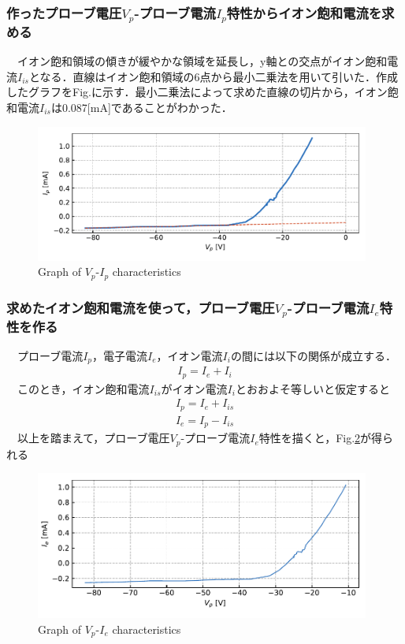 \subsubsection{作ったプローブ電圧$V_p$-プローブ電流$I_p$特性からイオン飽和電流を求める}
　イオン飽和領域の傾きが緩やかな領域を延長し，y軸との交点がイオン飽和電流$I_{is}$となる．直線はイオン飽和領域の6点から最小二乗法を用いて引いた．作成したグラフをFig.\label{fig:Vp-Ip-iis}に示す．最小二乗法によって求めた直線の切片から，イオン飽和電流$I_{is}$は0.087[mA]であることがわかった．
\begin{figure}[H]
    \centering
    \includegraphics[width=11cm]{./fig/3_2.pdf}
    \caption{Graph of $V_p$-$I_p$ characteristics}
    \label{fig:Vp-Ip-iis}
\end{figure}

\subsubsection{求めたイオン飽和電流を使って，プローブ電圧$V_p$-プローブ電流$I_e$特性を作る}
　プローブ電流$I_p$，電子電流$I_e$，イオン電流$I_i$の間には以下の関係が成立する．
\begin{eqnarray}
    I_p = I_e + I_i
\end{eqnarray}
　このとき，イオン飽和電流$I_{is}$がイオン電流$I_i$とおおよそ等しいと仮定すると
\begin{eqnarray}
    I_p = I_e + I_{is}\nonumber\\
    I_e = I_p - I_{is}
\end{eqnarray}
　以上を踏まえて，プローブ電圧$V_p$-プローブ電流$I_e$特性を描くと，Fig.\ref{fig:Vp-Ie}が得られる
\begin{figure}[H]
    \centering
    \includegraphics[width=11cm]{./fig/3_3.pdf}
    \caption{Graph of $V_p$-$I_e$ characteristics}
    \label{fig:Vp-Ie}
\end{figure}

